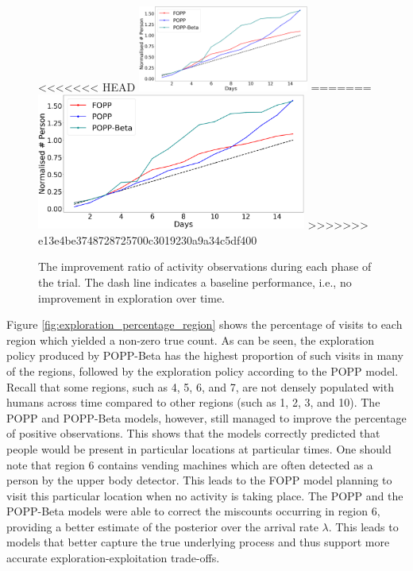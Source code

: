 \begin{figure}[t!]
	\centering
<<<<<<< HEAD
	\includegraphics[width=0.5\textwidth]{./figures/exploration_number_people_across_days_normalised.png}
=======
	\includegraphics[width=0.79\textwidth]{./figures/exploration_number_people_across_days_normalised.png}
>>>>>>> e13e4be3748728725700c3019230a9a34c5df400
	\caption{The improvement ratio of activity observations during each phase of the trial. The dash line indicates a baseline performance, i.e., no improvement in exploration over time.}
	\label{fig:exploration_improvement_ratio}
\end{figure}

Figure \ref{fig:exploration_percentage_region} shows the percentage of visits to each region which yielded a non-zero true count. As can be seen, the exploration policy produced by POPP-Beta has the highest proportion of such visits in many of the regions, followed by the exploration policy according to the POPP model. Recall that some regions, such as 4, 5, 6, and 7, are not densely populated with humans across time compared to other regions (such as 1, 2, 3, and 10). The POPP and POPP-Beta models, however, still managed to improve the percentage of positive observations. This shows that the models correctly predicted that people would be present in particular locations at particular times. One should note that region 6 contains vending machines which are often detected as a person by the upper body detector. This leads to the FOPP model planning to visit this particular location when no activity is taking place. The POPP and the POPP-Beta models were able to correct the miscounts occurring in region 6, providing a better estimate of the posterior over the arrival rate $\lambda$. This leads to models that better capture the true underlying process and thus support more accurate exploration-exploitation trade-offs.

